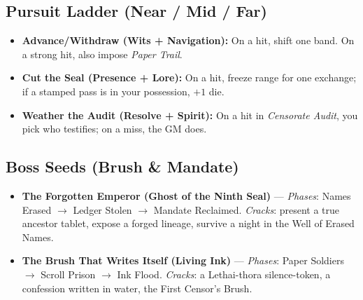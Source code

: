 \subsection*{Pursuit Ladder (Near / Mid / Far)}
\begin{itemize}
\item \textbf{Advance/Withdraw (Wits + Navigation):} On a hit, shift one band. On a strong hit, also impose \emph{Paper Trail}.
\item \textbf{Cut the Seal (Presence + Lore):} On a hit, freeze range for one exchange; if a stamped pass is in your possession, $+1$ die.
\item \textbf{Weather the Audit (Resolve + Spirit):} On a hit in \emph{Censorate Audit}, you pick who testifies; on a miss, the GM does.
\end{itemize}

\subsection*{Boss Seeds (Brush \& Mandate)}
\begin{itemize}
\item \textbf{The Forgotten Emperor (Ghost of the Ninth Seal)} --- \emph{Phases}: Names Erased $\rightarrow$ Ledger Stolen $\rightarrow$ Mandate Reclaimed. \emph{Cracks}: present a true ancestor tablet, expose a forged lineage, survive a night in the Well of Erased Names.
\item \textbf{The Brush That Writes Itself (Living Ink)} --- \emph{Phases}: Paper Soldiers $\rightarrow$ Scroll Prison $\rightarrow$ Ink Flood. \emph{Cracks}: a Lethai-thora silence-token, a confession written in water, the First Censor's Brush.
\end{itemize}

